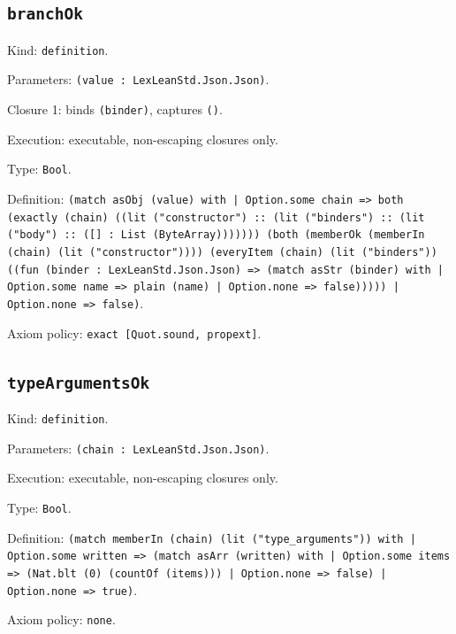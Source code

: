 \documentclass[11pt]{article}
\begin{document}
\subsection*{\texttt{branchOk}}
\noindent Kind: \texttt{definition}.\par
\noindent Parameters: \texttt{(value : LexLeanStd.Json.Json)}.\par
\noindent Closure 1: binds \texttt{(binder)}, captures \texttt{()}.\par
\noindent Execution: executable, non-escaping closures only.\par
\noindent Type: \texttt{Bool}.\par
\noindent Definition: \texttt{(match asObj (value) with | Option.some chain => both (exactly (chain) ((lit ("constructor") :: (lit ("binders") :: (lit ("body") :: ([] : List (ByteArray))))))) (both (memberOk (memberIn (chain) (lit ("constructor")))) (everyItem (chain) (lit ("binders")) ((fun (binder : LexLeanStd.Json.Json) => (match asStr (binder) with | Option.some name => plain (name) | Option.none => false))))) | Option.none => false)}.\par
\noindent Axiom policy: \texttt{exact [Quot.sound, propext]}.\par
\subsection*{\texttt{typeArgumentsOk}}
\noindent Kind: \texttt{definition}.\par
\noindent Parameters: \texttt{(chain : LexLeanStd.Json.Json)}.\par
\noindent Execution: executable, non-escaping closures only.\par
\noindent Type: \texttt{Bool}.\par
\noindent Definition: \texttt{(match memberIn (chain) (lit ("type\_arguments")) with | Option.some written => (match asArr (written) with | Option.some items => (Nat.blt (0) (countOf (items))) | Option.none => false) | Option.none => true)}.\par
\noindent Axiom policy: \texttt{none}.\par
\end{document}

